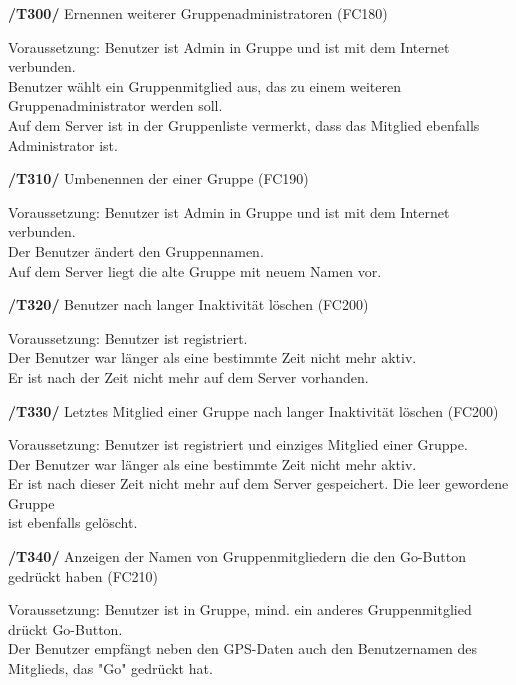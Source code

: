 \begin{itemize}
\begin{itemize}
\begin{itemize}
\begin{itemize}
\textbf{/T300/} Ernennen weiterer Gruppenadministratoren (FC180)\\
\begin{itemize}
Voraussetzung: Benutzer ist Admin in Gruppe und ist mit dem Internet verbunden.\\
Benutzer wählt ein Gruppenmitglied aus, das zu einem weiteren Gruppenadministrator werden soll.\\
Auf dem Server ist in der Gruppenliste vermerkt, dass das Mitglied ebenfalls Administrator ist.\\
\end{itemize}

\textbf{/T310/} Umbenennen der einer Gruppe (FC190)\\
\begin{itemize}
Voraussetzung: Benutzer ist Admin in Gruppe und ist mit dem Internet verbunden.\\
Der Benutzer ändert den Gruppennamen.\\
Auf dem Server liegt die alte Gruppe mit neuem Namen vor.\\
\end{itemize}

\textbf{/T320/} Benutzer nach langer Inaktivität löschen (FC200)\\
\begin{itemize}
Voraussetzung: Benutzer ist registriert.\\
Der Benutzer war länger als eine bestimmte Zeit nicht mehr aktiv.\\
Er ist nach der Zeit nicht mehr auf dem Server vorhanden.\\
\end{itemize}

\textbf{/T330/} Letztes Mitglied einer Gruppe nach langer Inaktivität löschen (FC200)\\
\begin{itemize}
Voraussetzung: Benutzer ist registriert und einziges Mitglied einer Gruppe.\\
Der Benutzer war länger als eine bestimmte Zeit nicht mehr aktiv.\\
Er ist nach dieser Zeit nicht mehr auf dem Server gespeichert. Die leer gewordene Gruppe\\
ist ebenfalls gelöscht.\\
\end{itemize}

\textbf{/T340/} Anzeigen der Namen von Gruppenmitgliedern die den Go-Button gedrückt haben (FC210)\\
\begin{itemize}
Voraussetzung: Benutzer ist in Gruppe, mind. ein anderes Gruppenmitglied drückt Go-Button.\\
Der Benutzer empfängt neben den GPS-Daten auch den Benutzernamen des Mitglieds, das "Go" gedrückt hat.\\
\end{itemize}


\end{itemize}
\end{itemize}
\end{itemize}
\end{itemize}
